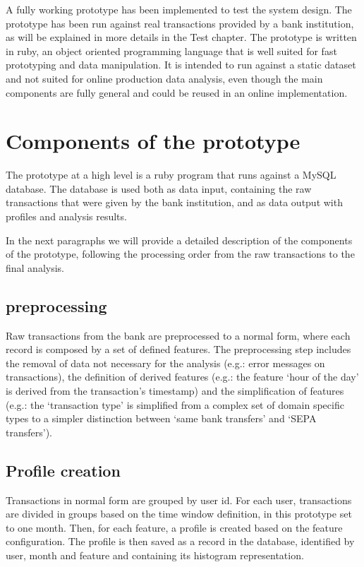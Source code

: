 
A fully working prototype has been implemented to test the system design. The prototype has been run against real transactions provided by a bank institution, as will be explained in more details in the Test chapter. The prototype is written in ruby, an object oriented programming language that is well suited for fast prototyping and data manipulation. It is intended to run against a static dataset and not suited for online production data analysis, even though the main components are fully general and could be reused in an online implementation.

\section{Components of the prototype}

The prototype at a high level is a ruby program that runs against a MySQL database. The database is used both as data input, containing the raw transactions that were given by the bank institution, and as data output with profiles and analysis results.

In the next paragraphs we will provide a detailed description of the components of the prototype, following the processing order from the raw transactions to the final analysis.

\subsection{preprocessing}
Raw transactions from the bank are preprocessed to a normal form, where each record is composed by a set of defined features. The preprocessing step includes the removal of data not necessary for the analysis (e.g.: error messages on transactions), the definition of derived features (e.g.: the feature `hour of the day' is derived from the transaction's timestamp) and the simplification of features (e.g.: the `transaction type' is simplified from a complex set of domain specific types to a simpler distinction between `same bank transfers' and `SEPA transfers').

\subsection{Profile creation}
Transactions in normal form are grouped by user id. For each user, transactions are divided in groups based on the time window definition, in this prototype set to one month. Then, for each feature, a profile is created based on the feature configuration. The profile is then saved as a record in the database, identified by user, month and feature and containing its histogram representation.

